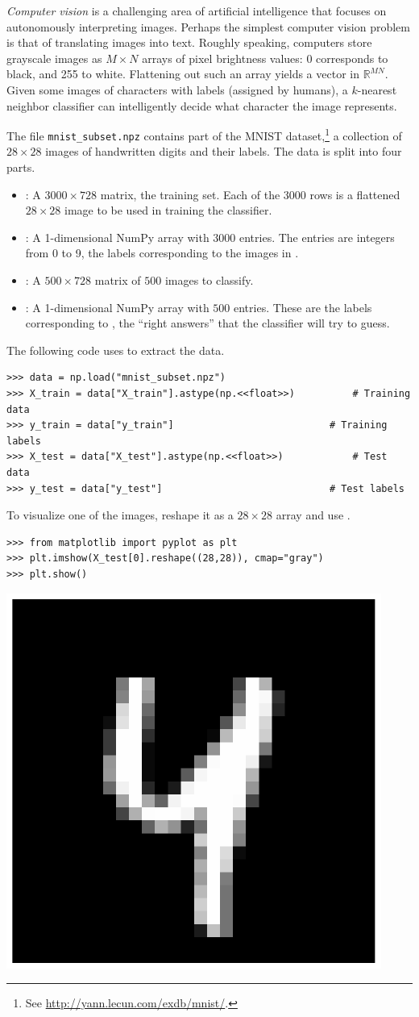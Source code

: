 \emph{Computer vision} is a challenging area of artificial intelligence that focuses on autonomously interpreting images.
Perhaps the simplest computer vision problem is that of translating images into text.
Roughly speaking, computers store grayscale images as $M \times N$ arrays of pixel brightness values: 0 corresponds to black, and 255 to white.
Flattening out such an array yields a vector in $\mathbb{R}^{MN}$.
Given some images of characters with labels (assigned by humans), a $k$-nearest neighbor classifier can intelligently decide what character the image represents.

\begin{problem}
The file \texttt{mnist\_subset.npz} contains part of the MNIST dataset,\footnote{See \url{http://yann.lecun.com/exdb/mnist/}.} a collection of $28\times 28$ images of handwritten digits and their labels.
The data is split into four parts.
\begin{itemize}
\item {}: A $3000\times 728$ matrix, the training set.
Each of the $3000$ rows is a flattened $28\times 28$ image to be used in training the classifier.

\item {}: A 1-dimensional NumPy array with $3000$ entries.
The entries are integers from 0 to 9, the labels corresponding to the images in .

\item {}: A $500\times 728$ matrix of $500$ images to classify.

\item {}: A 1-dimensional NumPy array with $500$ entries.
These are the labels corresponding to , the ``right answers'' that the classifier will try to guess.
\end{itemize}
The following code uses  to extract the data.
\begin{lstlisting}
>>> data = np.load("mnist_subset.npz")
>>> X_train = data["X_train"].astype(np.<<float>>)          # Training data
>>> y_train = data["y_train"]                           # Training labels
>>> X_test = data["X_test"].astype(np.<<float>>)            # Test data
>>> y_test = data["y_test"]                             # Test labels
\end{lstlisting}
To visualize one of the images, reshape it as a $28\times 28$ array and use .
\begin{lstlisting}
>>> from matplotlib import pyplot as plt
>>> plt.imshow(X_test[0].reshape((28,28)), cmap="gray")
>>> plt.show()
\end{lstlisting}
\begin{center}
\includegraphics[width=.15\textwidth]{figures/digit.pdf}
\end{center}


\end{problem}
